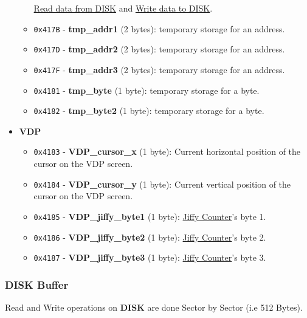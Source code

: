 \documentclass[a4paper,11pt]{article}
\begin{document}
\begin{itemize}
\begin{itemize}
            \hyperref[sec:howto_readdata]{Read data from DISK} and 
            \hyperref[sec:howto_writedata]{Write data to DISK}.
            \item \texttt{0x417B} - \textbf{tmp\_addr1} (2 bytes): temporary
            storage for an address.
            \item \texttt{0x417D} - \textbf{tmp\_addr2} (2 bytes): temporary
            storage for an address.
            \item \texttt{0x417F} - \textbf{tmp\_addr3} (2 bytes): temporary
            storage for an address.
            \item \texttt{0x4181} - \textbf{tmp\_byte} (1 byte): temporary
            storage for a byte.
            \item \texttt{0x4182} - \textbf{tmp\_byte2} (1 byte): temporary
            storage for a byte.
        \end{itemize}
        \item \textbf{VDP}
        \begin{itemize}
            \item \texttt{0x4183} - \textbf{VDP\_cursor\_x} (1 byte): Current
            horizontal position of the cursor on the VDP screen.
            \item \texttt{0x4184} - \textbf{VDP\_cursor\_y} (1 byte): Current
            vertical position of the cursor on the VDP screen.
            \item \texttt{0x4185} - \textbf{VDP\_jiffy\_byte1} (1 byte):
            \hyperref[subsec:jiffy_counter]{Jiffy Counter}'s byte 1.
            \item \texttt{0x4186} - \textbf{VDP\_jiffy\_byte2} (1 byte):
            \hyperref[subsec:jiffy_counter]{Jiffy Counter}'s byte 2.
            \item \texttt{0x4187} - \textbf{VDP\_jiffy\_byte3} (1 byte):
            \hyperref[subsec:jiffy_counter]{Jiffy Counter}'s byte 3.
        \end{itemize}
    \end{itemize}

    \subsubsection{DISK Buffer}

    Read and Write operations on \textbf{DISK} are done Sector by Sector (i.e 
    512 Bytes).
\end{document}
